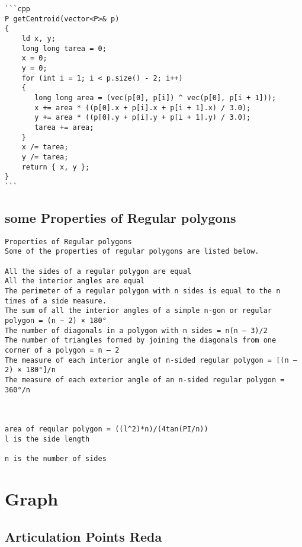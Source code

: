 \begin{lstlisting}[style=cpp]
```cpp  
P getCentroid(vector<P>& p)  
{  
    ld x, y;  
    long long tarea = 0;  
    x = 0;  
    y = 0;  
    for (int i = 1; i < p.size() - 2; i++)  
    {  
       long long area = (vec(p[0], p[i]) ^ vec(p[0], p[i + 1]));  
       x += area * ((p[0].x + p[i].x + p[i + 1].x) / 3.0);  
       y += area * ((p[0].y + p[i].y + p[i + 1].y) / 3.0);  
       tarea += area;  
    }  
    x /= tarea;  
    y /= tarea;  
    return { x, y };  
}
```
\end{lstlisting}

\subsection{some Properties of Regular polygons}

\begin{lstlisting}[style=cpp]
Properties of Regular polygons
Some of the properties of regular polygons are listed below.

All the sides of a regular polygon are equal
All the interior angles are equal
The perimeter of a regular polygon with n sides is equal to the n times of a side measure.
The sum of all the interior angles of a simple n-gon or regular polygon = (n − 2) × 180°
The number of diagonals in a polygon with n sides = n(n – 3)/2
The number of triangles formed by joining the diagonals from one corner of a polygon = n – 2
The measure of each interior angle of n-sided regular polygon = [(n – 2) × 180°]/n
The measure of each exterior angle of an n-sided regular polygon = 360°/n



area of reqular polygon = ((l^2)*n)/(4tan(PI/n))
l is the side length

n is the number of sides
\end{lstlisting}

\section{Graph}

\subsection{Articulation Points Reda}

